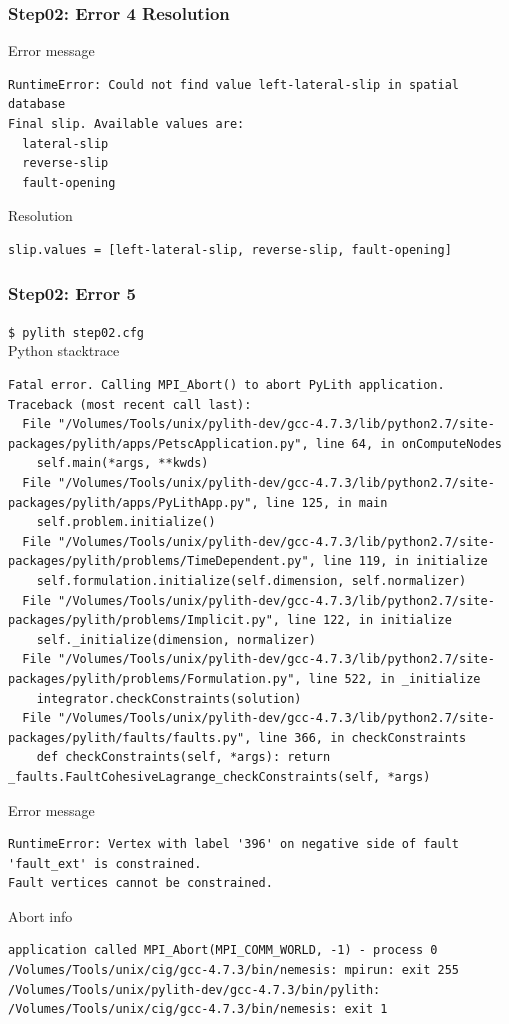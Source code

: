 \documentclass[aspectration=169]{beamer}
\newcommand{\cmd}[1]{{\footnotesize\tt \color{ltred}#1}}
\newcommand{\errlabel}[1]{{\small \color{blue}#1}}
\begin{document}
\begin{frame}[fragile]
  \frametitle{Step02: Error 4 Resolution}

\errlabel{Error message}
\begin{lstlisting}
RuntimeError: Could not find value left-lateral-slip in spatial database
Final slip. Available values are:
  lateral-slip
  reverse-slip
  fault-opening
\end{lstlisting}\pause
\errlabel{Resolution}
\begin{lstlisting}
slip.values = [left-lateral-slip, reverse-slip, fault-opening]
\end{lstlisting}

\end{frame}


\begin{frame}[fragile]
  \frametitle{Step02: Error 5}

\cmd{\$ pylith step02.cfg}\\
\errlabel{Python stacktrace}
\begin{lstlisting}
Fatal error. Calling MPI_Abort() to abort PyLith application.
Traceback (most recent call last):
  File "/Volumes/Tools/unix/pylith-dev/gcc-4.7.3/lib/python2.7/site-packages/pylith/apps/PetscApplication.py", line 64, in onComputeNodes
    self.main(*args, **kwds)
  File "/Volumes/Tools/unix/pylith-dev/gcc-4.7.3/lib/python2.7/site-packages/pylith/apps/PyLithApp.py", line 125, in main
    self.problem.initialize()
  File "/Volumes/Tools/unix/pylith-dev/gcc-4.7.3/lib/python2.7/site-packages/pylith/problems/TimeDependent.py", line 119, in initialize
    self.formulation.initialize(self.dimension, self.normalizer)
  File "/Volumes/Tools/unix/pylith-dev/gcc-4.7.3/lib/python2.7/site-packages/pylith/problems/Implicit.py", line 122, in initialize
    self._initialize(dimension, normalizer)
  File "/Volumes/Tools/unix/pylith-dev/gcc-4.7.3/lib/python2.7/site-packages/pylith/problems/Formulation.py", line 522, in _initialize
    integrator.checkConstraints(solution)
  File "/Volumes/Tools/unix/pylith-dev/gcc-4.7.3/lib/python2.7/site-packages/pylith/faults/faults.py", line 366, in checkConstraints
    def checkConstraints(self, *args): return _faults.FaultCohesiveLagrange_checkConstraints(self, *args)
\end{lstlisting}
\errlabel{Error message}
\begin{lstlisting}
RuntimeError: Vertex with label '396' on negative side of fault 'fault_ext' is constrained.
Fault vertices cannot be constrained.
\end{lstlisting}
\errlabel{Abort info}
\begin{lstlisting}
application called MPI_Abort(MPI_COMM_WORLD, -1) - process 0
/Volumes/Tools/unix/cig/gcc-4.7.3/bin/nemesis: mpirun: exit 255
/Volumes/Tools/unix/pylith-dev/gcc-4.7.3/bin/pylith: /Volumes/Tools/unix/cig/gcc-4.7.3/bin/nemesis: exit 1
\end{lstlisting}

\end{frame}
\end{document}
